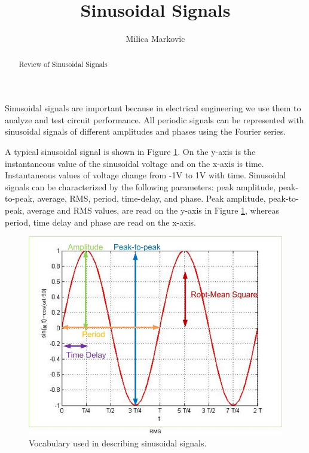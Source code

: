 \documentclass{ximera}
\title{Sinusoidal Signals}
\author{Milica Markovic}
\begin{document}
  
\begin{abstract}  
Review of Sinusoidal Signals
\end{abstract}  
\maketitle



Sinusoidal signals are important because in electrical engineering we use them to analyze and test circuit performance. All periodic signals can be represented with sinusoidal signals of different amplitudes and phases using the Fourier series. 

A typical sinusoidal signal is shown in Figure \ref{sinusoid}. On the y-axis is the instantaneous value of the sinusoidal voltage and on the x-axis is time. Instantaneous values of voltage change from -1V to 1V with time. Sinusoidal signals can be characterized by the following parameters: peak amplitude, peak-to-peak, average, RMS, period, time-delay, and phase. Peak amplitude, peak-to-peak, average and RMS values, are read on the y-axis in Figure \ref{sinusoid}, whereas period, time delay and phase are read on the x-axis.

\begin{figure}[htbp]
\includegraphics[scale=0.4]{jpg/sinusoid.jpg}
\caption{Vocabulary used in describing sinusoidal signals.}
\label{sinusoid}
\end{figure} 
\end{document}
